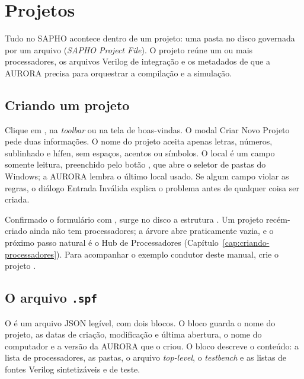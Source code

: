 \chapter{Projetos}
\label{cap:projetos}

Tudo no SAPHO acontece dentro de um projeto: uma pasta no disco governada por um arquivo  (\textit{SAPHO Project File}). O projeto reúne um ou mais processadores, os arquivos Verilog de integração e os metadados de que a AURORA precisa para orquestrar a compilação e a simulação.

\section{Criando um projeto}
\label{sec:criando-projeto}

Clique em , na \textit{toolbar} ou na tela de boas-vindas. O modal Criar Novo Projeto pede duas informações. O nome do projeto aceita apenas letras, números, sublinhado e hífen, sem espaços, acentos ou símbolos. O local é um campo somente leitura, preenchido pelo botão , que abre o seletor de pastas do Windows; a AURORA lembra o último local usado. Se algum campo violar as regras, o diálogo Entrada Inválida explica o problema antes de qualquer coisa ser criada.

Confirmado o formulário com , surge no disco a estrutura . Um projeto recém-criado ainda não tem processadores; a árvore abre praticamente vazia, e o próximo passo natural é o Hub de Processadores (Capítulo~\ref{cap:criando-processadores}). Para acompanhar o exemplo condutor deste manual, crie o projeto .


\section{O arquivo \texttt{.spf}}
\label{sec:spf}

O  é um arquivo JSON legível, com dois blocos. O bloco  guarda o nome do projeto, as datas de criação, modificação e última abertura, o nome do computador e a versão da AURORA que o criou. O bloco  descreve o conteúdo: a lista de processadores, as pastas, o arquivo \textit{top-level}, o \textit{testbench} e as listas de fontes Verilog sintetizáveis e de teste.

